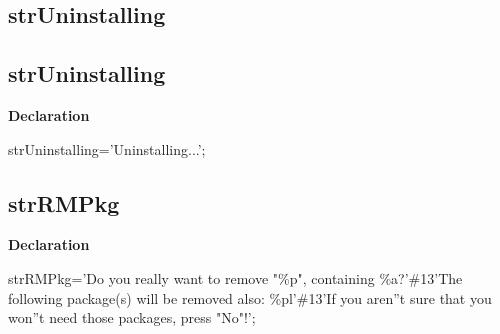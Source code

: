 \documentclass{report}
\newif\ifpdf
\begin{document}
\subsection*{\large{\textbf{strUninstalling}}\normalsize\hspace{1ex}\hrulefill}
\else
\subsection*{strUninstalling}
\fi
\label{trstrings-strUninstalling}
\begin{list}{}{
\setlength{\itemindent}{0cm}
\setlength{\listparindent}{0cm}
\setlength{\leftmargin}{\evensidemargin}
\addtolength{\leftmargin}{\tmplength}
\settowidth{\labelsep}{X}
\addtolength{\leftmargin}{\labelsep}
\setlength{\labelwidth}{\tmplength}
}
\item[\textbf{Declaration}\hfill]
\ifpdf
\begin{flushleft}
\fi
\begin{ttfamily}
strUninstalling='Uninstalling...';\end{ttfamily}

\ifpdf
\end{flushleft}
\fi

\end{list}
\ifpdf
\subsection*{\large{\textbf{strRMPkg}}\normalsize\hspace{1ex}\hrulefill}
\else
\subsection*{strRMPkg}
\fi
\label{trstrings-strRMPkg}
\begin{list}{}{
\setlength{\itemindent}{0cm}
\setlength{\listparindent}{0cm}
\setlength{\leftmargin}{\evensidemargin}
\addtolength{\leftmargin}{\tmplength}
\settowidth{\labelsep}{X}
\addtolength{\leftmargin}{\labelsep}
\setlength{\labelwidth}{\tmplength}
}
\item[\textbf{Declaration}\hfill]
\ifpdf
\begin{flushleft}
\fi
\begin{ttfamily}
strRMPkg='Do you really want to remove "{\%}p", containing {\%}a?'{\#}13'The following package(s) will be removed also: {\%}pl'{\#}13'If you aren''t sure that you won''t need those packages, press "No"!';\end{ttfamily}

\ifpdf
\end{flushleft}
\fi

\end{list}
\ifpdf
\end{document}
